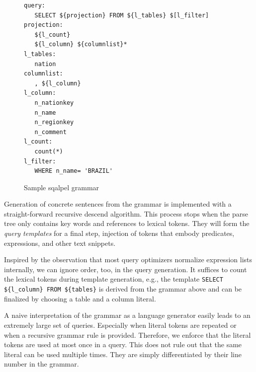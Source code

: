 \documentclass{cidr-2019}
\begin{document}
\begin{figure}[t]
\begin{verbatim}
query:
   SELECT ${projection} FROM ${l_tables} $[l_filter]
projection:
   ${l_count}
   ${l_column} ${columnlist}*
l_tables:
   nation
columnlist:
   , ${l_column}
l_column: 
   n_nationkey
   n_name
   n_regionkey
   n_comment
l_count: 
   count(*)
l_filter: 
   WHERE n_name= 'BRAZIL'
\end{verbatim}
	\caption{Sample {\sc sqalpel} grammar \label{fig:script1}}
\end{figure}

Generation of concrete sentences from the grammar is implemented with
a straight-forward recursive descend algorithm. This process stops
when the parse tree only contains key words and references to lexical
tokens. They will form the \emph{ query templates} for a final step,
injection of tokens that embody predicates, expressions, and other
text snippets.

Inspired by the observation that most query optimizers normalize
expression lists internally, we can ignore order, too, in the query
generation. It suffices to count the lexical tokens during template
generation, e.g., the template \verb~SELECT ${l_column} FROM ${tables}~
is derived from the grammar above and can be finalized by choosing a
table and a column literal.

A naive interpretation of the grammar as a language generator easily
leads to an extremely large set of queries. Especially when literal
tokens are repeated or when a recursive grammar rule is provided.
Therefore, we enforce that the literal tokens are used at most once in
a query. This does not rule out that the same literal can be used
multiple times. They are simply differentiated by their line number in the
grammar.



\end{document}
